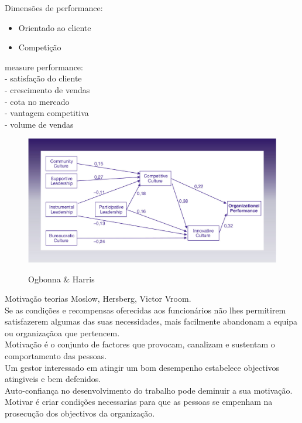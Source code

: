 Dimensões de performance:
\begin{itemize}
\item Orientado ao cliente
\item Competição
\end{itemize}




measure performance:\\
- satisfação do cliente\\
- crescimento de vendas\\
- cota no mercado\\
- vantagem competitiva\\
- volume de vendas\\

\begin{figure}[H]
\centering
\includegraphics[scale=.3]{"./image/OB/Ogbonna & Harris.jpg"}\\
\caption{Ogbonna \& Harris}
\label{grafico 1}
\end{figure}\par



Motivação teorias Moslow, Hersberg, Victor Vroom.\\
Se as condições e recompensas oferecidas aos funcionários não lhes permitirem satisfazerem algumas das suas necessidades, mais facilmente abandonam a equipa ou organizaçãoa que pertencem.\\
Motivação é o conjunto de factores que provocam, canalizam e sustentam o comportamento das pessoas.\\

Um gestor interessado em atingir um bom desempenho estabelece objectivos atingiveis e bem defenidos.\\
Auto-confiança no desenvolvimento do trabalho pode deminuir a sua motivação.\\
Motivar é criar condições necessarias para que as pessoas se empenham na prosecução dos objectivos da organização.\\

